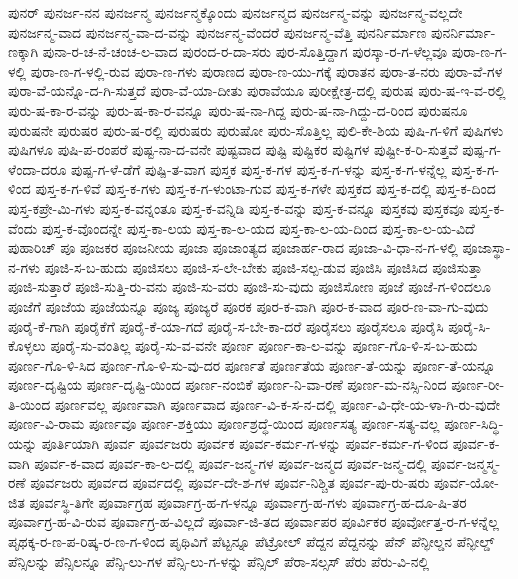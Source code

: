 {ಪುನರ್
ಪುನರ್ಜ-ನನ
ಪುನರ್ಜನ್ಮ
ಪುನರ್ಜನ್ಮಕ್ಕೊಂದು
ಪುನರ್ಜನ್ಮದ
ಪುನರ್ಜನ್ಮ-ವನ್ನು
ಪುನರ್ಜನ್ಮ-ವಲ್ಲದೇ
ಪುನರ್ಜನ್ಮ-ವಾದ
ಪುನರ್ಜನ್ಮ-ವಾ-ದ-ವನ್ನು
ಪುನರ್ಜನ್ಮ-ವೆಂದರೆ
ಪುನರ್ಜನ್ಮ-ವೆತ್ತಿ
ಪುನರ್ನಿರ್ಮಾಣ
ಪುನರ್ನಿರ್ಮಾ-ಣಕ್ಕಾಗಿ
ಪುನಾ-ರ-ಚ-ನೆ-ಚಂಚ-ಲ-ವಾದ
ಪುರಂದ-ರ-ದಾ-ಸರು
ಪುರ-ಸೊತ್ತಿದ್ದಾಗ
ಪುರಸ್ಕಾ-ರ-ಗ-ಳೆಲ್ಲವೂ
ಪುರಾ-ಣ-ಗ-ಳಲ್ಲಿ
ಪುರಾ-ಣ-ಗ-ಳಲ್ಲಿ-ರುವ
ಪುರಾ-ಣ-ಗಳು
ಪುರಾಣದ
ಪುರಾ-ಣ-ಯು-ಗಕ್ಕೆ
ಪುರಾತನ
ಪುರಾ-ತ-ನರು
ಪುರಾ-ವೆ-ಗಳ
ಪುರಾ-ವೆ-ಯನ್ನೊ-ದ-ಗಿ-ಸುತ್ತದೆ
ಪುರಾ-ವೆ-ಯಾ-ದೀತು
ಪುರಾವೆಯೂ
ಪುರೀಕ್ಷೇತ್ರ-ದಲ್ಲಿ
ಪುರುಷ
ಪುರು-ಷ-ಇ-ವ-ರಲ್ಲಿ
ಪುರು-ಷ-ಕಾ-ರ-ವನ್ನು
ಪುರು-ಷ-ಕಾ-ರ-ವನ್ನೂ
ಪುರು-ಷ-ನಾ-ಗಿದ್ದ
ಪುರು-ಷ-ನಾ-ಗಿದ್ದು-ದ-ರಿಂದ
ಪುರುಷನೂ
ಪುರುಷನೇ
ಪುರುಷರ
ಪುರು-ಷ-ರಲ್ಲಿ
ಪುರುಷರು
ಪುರುಷೋ
ಪುರು-ಸೊತ್ತಿಲ್ಲ
ಪುಲಿ-ಕೇ-ಶಿಯ
ಪುಷಿ-ಗ-ಳಿಗೆ
ಪುಷಿಗಳು
ಪುಷಿಗಳೂ
ಪುಷಿ-ಪ-ರಂಪರೆ
ಪುಷ್ಟ-ನಾ-ದ-ವನೇ
ಪುಷ್ಟವಾದ
ಪುಷ್ಟಿ
ಪುಷ್ಟಿಕರ
ಪುಷ್ಟಿಗಳ
ಪುಷ್ಟೀ-ಕ-ರಿ-ಸುತ್ತವೆ
ಪುಷ್ಪ-ಗ-ಳೆಂದಾ-ದರೂ
ಪುಷ್ಪ-ಗ-ಳೆ-ಡೆಗೆ
ಪುಷ್ಪಿ-ತ-ವಾಗ
ಪುಸ್ತಕ
ಪುಸ್ತ-ಕ-ಗಳ
ಪುಸ್ತ-ಕ-ಗ-ಳನ್ನು
ಪುಸ್ತ-ಕ-ಗ-ಳನ್ನೆಲ್ಲ
ಪುಸ್ತ-ಕ-ಗ-ಳಿಂದ
ಪುಸ್ತ-ಕ-ಗ-ಳಿವೆ
ಪುಸ್ತ-ಕ-ಗಳು
ಪುಸ್ತ-ಕ-ಗ-ಳುಂಟಾ-ಗುವ
ಪುಸ್ತ-ಕ-ಗಳೇ
ಪುಸ್ತಕದ
ಪುಸ್ತ-ಕ-ದಲ್ಲಿ
ಪುಸ್ತ-ಕ-ದಿಂದ
ಪುಸ್ತ-ಕಪ್ರೇ-ಮಿ-ಗಳು
ಪುಸ್ತ-ಕ-ವನ್ನಂತೂ
ಪುಸ್ತ-ಕ-ವನ್ನಿಡಿ
ಪುಸ್ತ-ಕ-ವನ್ನು
ಪುಸ್ತ-ಕ-ವನ್ನೂ
ಪುಸ್ತಕವು
ಪುಸ್ತಕವೂ
ಪುಸ್ತ-ಕ-ವೆಂದು
ಪುಸ್ತ-ಕ-ವೊಂದನ್ನೇ
ಪುಸ್ತ-ಕಾ-ಲಯ
ಪುಸ್ತ-ಕಾ-ಲ-ಯದ
ಪುಸ್ತ-ಕಾ-ಲ-ಯ-ದಿಂದ
ಪುಸ್ತ-ಕಾ-ಲ-ಯ-ವಿದೆ
ಪುಹಾರಿಚ್
ಪೂ
ಪೂಜಕರ
ಪೂಜನೀಯ
ಪೂಜಾ
ಪೂಜಾಂತ್ಯದ
ಪೂಜಾರ್ಹ-ರಾದ
ಪೂಜಾ-ವಿ-ಧಾ-ನ-ಗ-ಳಲ್ಲಿ
ಪೂಜಾಸ್ಥಾ-ನ-ಗಳು
ಪೂಜಿ-ಸ-ಬ-ಹುದು
ಪೂಜಿಸಲು
ಪೂಜಿ-ಸ-ಲೇ-ಬೇಕು
ಪೂಜಿ-ಸಲ್ಪ-ಡುವ
ಪೂಜಿಸಿ
ಪೂಜಿಸಿದ
ಪೂಜಿಸುತ್ತಾ
ಪೂಜಿ-ಸುತ್ತಾರೆ
ಪೂಜಿ-ಸುತ್ತಿ-ರು-ವನು
ಪೂಜಿ-ಸು-ವರು
ಪೂಜಿ-ಸು-ವುದು
ಪೂಜಿಸೋಣ
ಪೂಜೆ
ಪೂಜೆ-ಗ-ಳಿಂದಲೂ
ಪೂಜೆಗೆ
ಪೂಜೆಯ
ಪೂಜೆಯನ್ನೂ
ಪೂಜ್ಯ
ಪೂಜ್ಯರೆ
ಪೂರಕ
ಪೂರ-ಕ-ವಾಗಿ
ಪೂರ-ಕ-ವಾದ
ಪೂರ-ಣ-ವಾ-ಗು-ವುದು
ಪೂರೈ-ಕೆ-ಗಾಗಿ
ಪೂರೈಕೆಗೆ
ಪೂರೈ-ಕೆ-ಯಾ-ಗದೆ
ಪೂರೈ-ಸ-ಬೇ-ಕಾ-ದರೆ
ಪೂರೈಸಲು
ಪೂರೈಸಲೂ
ಪೂರೈಸಿ
ಪೂರೈ-ಸಿ-ಕೊಳ್ಳಲು
ಪೂರೈ-ಸು-ವಂತಿಲ್ಲ
ಪೂರೈ-ಸು-ವ-ವನೇ
ಪೂರ್ಣ
ಪೂರ್ಣ-ಕಾ-ಲ-ವನ್ನು
ಪೂರ್ಣ-ಗೊ-ಳಿ-ಸ-ಬ-ಹುದು
ಪೂರ್ಣ-ಗೊ-ಳಿ-ಸಿದ
ಪೂರ್ಣ-ಗೊ-ಳಿ-ಸು-ವು-ದರ
ಪೂರ್ಣತೆ
ಪೂರ್ಣತೆಯ
ಪೂರ್ಣ-ತೆ-ಯನ್ನು
ಪೂರ್ಣ-ತೆ-ಯನ್ನೂ
ಪೂರ್ಣ-ದೃಷ್ಟಿಯ
ಪೂರ್ಣ-ದೃಷ್ಟಿ-ಯಿಂದ
ಪೂರ್ಣ-ನಂಬಿಕೆ
ಪೂರ್ಣ-ನಿ-ವಾ-ರಣೆ
ಪೂರ್ಣ-ಮ-ನಸ್ಸಿ-ನಿಂದ
ಪೂರ್ಣ-ರೀ-ತಿ-ಯಿಂದ
ಪೂರ್ಣವಲ್ಲ
ಪೂರ್ಣವಾಗಿ
ಪೂರ್ಣವಾದ
ಪೂರ್ಣ-ವಿ-ಕ-ಸ-ನ-ದಲ್ಲಿ
ಪೂರ್ಣ-ವಿ-ಧೇ-ಯ-ಳಾ-ಗಿ-ರು-ವುದೇ
ಪೂರ್ಣ-ವಿ-ರಾಮ
ಪೂರ್ಣವೂ
ಪೂರ್ಣ-ಶಕ್ತಿಯು
ಪೂರ್ಣಶ್ರದ್ಧೆ-ಯಿಂದ
ಪೂರ್ಣಸತ್ಯ
ಪೂರ್ಣ-ಸತ್ಯ-ವಲ್ಲ
ಪೂರ್ಣ-ಸಿದ್ಧಿ-ಯನ್ನು
ಪೂರ್ತಿಯಾಗಿ
ಪೂರ್ವ
ಪೂರ್ವಜರು
ಪೂರ್ವಕ
ಪೂರ್ವ-ಕರ್ಮ-ಗ-ಳನ್ನು
ಪೂರ್ವ-ಕರ್ಮ-ಗ-ಳಿಂದ
ಪೂರ್ವ-ಕ-ವಾಗಿ
ಪೂರ್ವ-ಕ-ವಾದ
ಪೂರ್ವ-ಕಾ-ಲ-ದಲ್ಲಿ
ಪೂರ್ವ-ಜನ್ಮ-ಗಳ
ಪೂರ್ವ-ಜನ್ಮದ
ಪೂರ್ವ-ಜನ್ಮ-ದಲ್ಲಿ
ಪೂರ್ವ-ಜನ್ಮಸ್ಮ-ರಣೆ
ಪೂರ್ವಜರು
ಪೂರ್ವದ
ಪೂರ್ವದಲ್ಲಿ
ಪೂರ್ವ-ದೇ-ಶ-ಗಳ
ಪೂರ್ವ-ನಿಶ್ಚಿತ
ಪೂರ್ವ-ಪು-ರು-ಷರು
ಪೂರ್ವ-ಯೋ-ಜಿತ
ಪೂರ್ವಸ್ಥಿ-ತಿಗೇ
ಪೂರ್ವಾಗ್ರಹ
ಪೂರ್ವಾಗ್ರ-ಹ-ಗ-ಳನ್ನೂ
ಪೂರ್ವಾಗ್ರ-ಹ-ಗಳು
ಪೂರ್ವಾಗ್ರ-ಹ-ದೂ-ಷಿ-ತರ
ಪೂರ್ವಾಗ್ರ-ಹ-ವಿ-ರುವ
ಪೂರ್ವಾಗ್ರ-ಹ-ವಿಲ್ಲದೆ
ಪೂರ್ವಾ-ಜಿ-ತದ
ಪೂರ್ವಾಪರ
ಪೂರ್ವಿಕರ
ಪೂರ್ವೋತ್ತ-ರ-ಗ-ಳನ್ನೆಲ್ಲ
ಪೃಥಕ್ಕ-ರ-ಣ-ಪ-ರಿಷ್ಕ-ರ-ಣ-ಗ-ಳಿಂದ
ಪೃಥಿವಿಗೆ
ಪೆಟ್ಟನ್ನೂ
ಪೆಟ್ರೋಲ್
ಪೆದ್ದನ
ಪೆದ್ದನನ್ನು
ಪೆನ್
ಪೆನ್ಫೀಲ್ಡನ
ಪೆನ್ಫೀಲ್ಡ್
ಪೆನ್ಸಿಲನ್ನು
ಪೆನ್ಸಿಲನ್ನೂ
ಪೆನ್ಸಿ-ಲು-ಗಳ
ಪೆನ್ಸಿ-ಲು-ಗ-ಳನ್ನು
ಪೆನ್ಸಿಲ್
ಪೆರಾ-ಸಲ್ಸಸ್
ಪೆರು
ಪೆರು-ವಿ-ನಲ್ಲಿ
}
